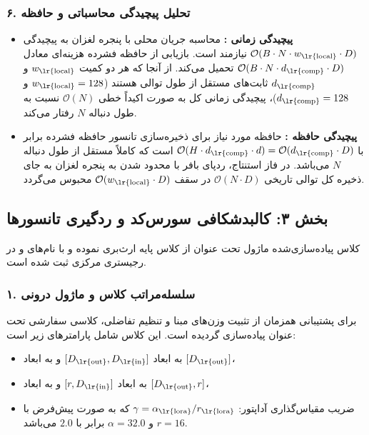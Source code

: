 \subsubsection*{۶. تحلیل پیچیدگی محاسباتی و حافظه}
\begin{itemize}
    \item \textbf{پیچیدگی زمانی :}
    محاسبه جریان محلی با پنجره لغزان به پیچیدگی $\mathcal{O}(B \cdot N \cdot w_{\text{\lr{local}}} \cdot D)$ نیازمند است. بازیابی از حافظه فشرده هزینه‌ای معادل $\mathcal{O}(B \cdot N \cdot d_{\text{\lr{comp}}} \cdot D)$ تحمیل می‌کند. از آنجا که هر دو کمیت $w_{\text{\lr{local}}}$ و $d_{\text{\lr{comp}}}$ ثابت‌های مستقل از طول توالی هستند ($w_{\text{\lr{local}}} = 128$ و $d_{\text{\lr{comp}}} = 128$)، پیچیدگی زمانی کل به صورت اکیداً خطی $\mathcal{O}(N)$ نسبت به طول دنباله $N$ رفتار می‌کند.
    \item \textbf{پیچیدگی حافظه :}
    حافظه مورد نیاز برای ذخیره‌سازی تانسور حافظه فشرده برابر با $\mathcal{O}(H \cdot d_{\text{\lr{comp}}} \cdot d) = \mathcal{O}(d_{\text{\lr{comp}}} \cdot D)$ است که کاملاً مستقل از طول دنباله $N$ می‌باشد. در فاز استنتاج، ردپای بافر با محدود شدن به پنجره لغزان به جای ذخیره کل توالی تاریخی $\mathcal{O}(N \cdot D)$ در سقف $\mathcal{O}(w_{\text{\lr{local}}} \cdot D)$ محبوس می‌گردد.
\end{itemize}

\subsection*{بخش ۳: کالبدشکافی سورس‌کد و ردگیری تانسورها }
کلاس پیاده‌سازی‌شده ماژول تحت عنوان  از کلاس پایه  ارث‌بری نموده و با نام‌های  و  در رجیستری مرکزی ثبت شده است.

\subsubsection*{۱. سلسله‌مراتب کلاس و ماژول درونی }
برای پشتیبانی همزمان از تثبیت وزن‌های مبنا  و تنظیم تفاضلی، کلاسی سفارشی تحت عنوان  پیاده‌سازی گردیده است. این کلاس شامل پارامترهای زیر است:
\begin{itemize}
    \item {} به ابعاد $[D_{\text{\lr{out}}}, D_{\text{\lr{in}}}]$ و  به ابعاد $[D_{\text{\lr{out}}}]$،
    \item {} به ابعاد $[r, D_{\text{\lr{in}}}]$ و  به ابعاد $[D_{\text{\lr{out}}}, r]$،
    \item ضریب مقیاس‌گذاری آداپتور: $\gamma = \alpha_{\text{\lr{lora}}} / r_{\text{\lr{lora}}}$ که به صورت پیش‌فرض با $r=16$ و $\alpha=32.0$ برابر با $2.0$ می‌باشد.
\end{itemize}


